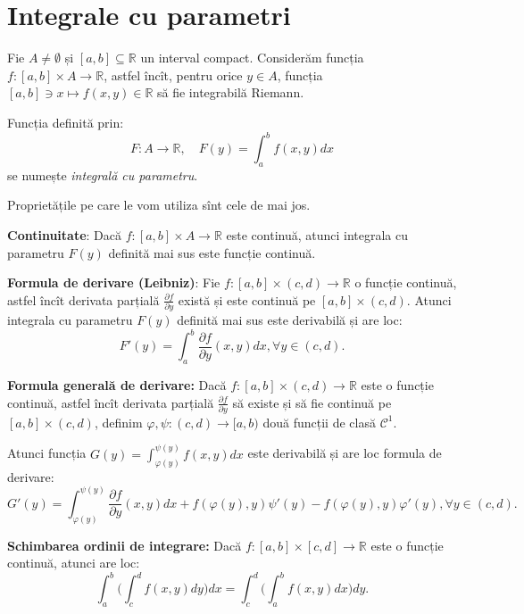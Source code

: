 \documentclass[11pt,a4paper]{article}
\newcommand\kal{\mathcal}
\newcommand\seq{\subseteq}
\newcommand\vid{\emptyset}
\newcommand\RR{\mathbb{R}}
\theoremstyle{dotless}
\theoremstyle{dotlessdr}
\begin{document}

\section{Integrale cu parametri}
\label{sec:int-param}

Fie $A \neq \vid$ și $[a, b] \seq \RR$ un interval compact. Considerăm funcția
$f : [a, b] \times A \to \RR$, astfel încît, pentru orice $y \in A$, funcția
$[a, b] \ni x \mapsto f(x, y) \in \RR$ să fie integrabilă Riemann.

Funcția definită prin:
\[
  F : A \to \RR, \quad F(y) = \int_a^b f(x, y) dx
\]
se numește \emph{integrală cu parametru}.

Proprietățile pe care le vom utiliza sînt cele de mai jos.

\textbf{Continuitate}: Dacă $f : [a, b] \times A \to \RR$ este continuă, atunci
integrala cu parametru $F(y)$ definită mai sus este funcție continuă.

\vspace{1cm}

\textbf{Formula de derivare (Leibniz)}: Fie $f : [a, b] \times (c, d) \to \RR$
o funcție continuă, astfel încît derivata parțială $\frac{\partial f}{\partial y}$
există și este continuă pe $[a, b] \times (c, d)$. Atunci integrala cu parametru
$F(y)$ definită mai sus este derivabilă și are loc:
\[
  F'(y) = \int_a^b \frac{\partial f}{\partial y}(x, y) dx, \forall y \in (c, d).
\]

\vspace{1cm}

\textbf{Formula generală de derivare:} Dacă $f : [a, b] \times (c, d) \to \RR$
este o funcție continuă, astfel încît derivata parțială $\frac{\partial f}{\partial y}$
să existe și să fie continuă pe $[a, b] \times (c, d)$, definim
$\varphi, \psi : (c, d) \to [a, b)$ două funcții de clasă $\kal{C}^1$.

Atunci funcția $G(y) = \int_{\varphi(y)}^{\psi(y)} f(x, y) dx$ este derivabilă
și are loc formula de derivare:
\[
  G'(y) = \int_{\varphi(y)}^{\psi(y)} \frac{\partial f}{\partial y}(x, y) dx + %
  f(\varphi(y), y) \psi'(y) - f(\varphi(y), y) \varphi'(y), \forall y \in (c, d).
\]

\vspace{1cm}

\textbf{Schimbarea ordinii de integrare:} Dacă $f: [a, b] \times [c, d] \to \RR$
este o funcție continuă, atunci are loc:
\[
  \int_a^b \Big( \int_c^d f(x, y) dy \Big) dx = %
  \int_c^d \Big( \int_a^b f(x, y) dx \Big) dy.
\]
\end{document}
